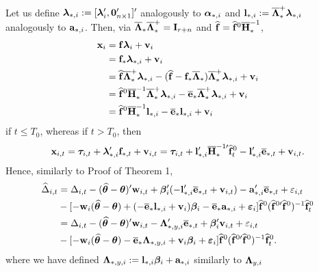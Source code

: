 \documentclass[12pt,fleqn]{article}
\begin{document}
Let us define $\boldsymbol{\lambda}_{*,i} := [\boldsymbol{\lambda}_i', \mathbf{0}_{n\times 1}']'$ analogously to $\boldsymbol{\alpha}_{*,i}$ and $\mathbf{l}_{*,i} := \overline{\boldsymbol{\Lambda}}_*^+\boldsymbol{\lambda}_{*,i}$ analogously to $\mathbf{a}_{*,i}$. Then, via $\overline{\boldsymbol{\Lambda}}_*\overline{\boldsymbol{\Lambda}}_*^+ = \mathbf{I}_{r+n}$ and $\widehat{\mathbf{f}} = \widehat{\mathbf{f}}^0\overline{\mathbf{H}}_*^{-1}$,
\begin{align}
\mathbf{x}_i &= \mathbf{f}\boldsymbol{\lambda}_i + \mathbf{v}_i \notag\\
& = \mathbf{f}_*\boldsymbol{\lambda}_{*,i} + \mathbf{v}_i  \notag\\
& = \widehat{\mathbf{f}}\overline{\boldsymbol{\Lambda}}_*^+\boldsymbol{\lambda}_{*,i} -  (\widehat{\mathbf{f}} - \mathbf{f}_*\overline{\boldsymbol{\Lambda}}_*)\overline{\boldsymbol{\Lambda}}_*^+\boldsymbol{\lambda}_{*,i}  + \mathbf{v}_i \notag\\
& = \widehat{\mathbf{f}}^0\overline{\mathbf{H}}_*^{-1}\overline{\boldsymbol{\Lambda}}_*^+\boldsymbol{\lambda}_{*,i}  - \overline{\mathbf{e}}_{*}\overline{\boldsymbol{\Lambda}}_*^+\boldsymbol{\lambda}_{*,i}  + \mathbf{v}_i\notag\\
& = \widehat{\mathbf{f}}^0\overline{\mathbf{H}}_*^{-1}\mathbf{l}_{*,i}  - \overline{\mathbf{e}}_{*}\mathbf{l}_{*,i}  + \mathbf{v}_i
\end{align}
if $t\leq T_0$, whereas if $t > T_0$, then
\begin{eqnarray}
\mathbf{x}_{i,t} = \boldsymbol{\tau}_{i,t} + \boldsymbol{\lambda}_{*,i}'\mathbf{f}_{*,t} + \mathbf{v}_{i,t} =  \boldsymbol{\tau}_{i,t} + \mathbf{l}_{*,i}'\overline{\mathbf{H}}_*^{-1\prime}\widehat{\mathbf{f}}_t^0  - \mathbf{l}_{*,i}'\overline{\mathbf{e}}_{*,t}  + \mathbf{v}_{i,t}.
\end{eqnarray}
Hence, similarly to Proof of Theorem 1,
\begin{align}
\widehat \Delta_{i,t} & = \Delta_{i,t} - (\widehat{\boldsymbol{\theta}} - \boldsymbol{\theta})'\mathbf{w}_{i,t}  + \boldsymbol{\beta}_i'(- \mathbf{l}_{*,i}'\overline{\mathbf{e}}_{*,t}  + \mathbf{v}_{i,t})  - \mathbf{a}_{*,i}'\overline{\mathbf{e}}_{*,t} + \varepsilon_{i,t} \notag\\
& - [ -\mathbf{w}_{i}(\widehat{\boldsymbol{\theta}} - \boldsymbol{\theta}) + ( - \overline{\mathbf{e}}_{*}\mathbf{l}_{*,i}  + \mathbf{v}_i )\boldsymbol{\beta}_i  - \overline{\mathbf{e}}_*\mathbf{a}_{*,i} +  \boldsymbol{\varepsilon}_{i} ] \widehat{\mathbf{f}}^{0}(\widehat{\mathbf{f}}^{0\prime}\widehat{\mathbf{f}}^0)^{-1}\widehat{\mathbf{f}}_{t}^0 \notag\\
& = \Delta_{i,t} - (\widehat{\boldsymbol{\theta}} - \boldsymbol{\theta})'\mathbf{w}_{i,t} - \boldsymbol{\Lambda}_{*,y,i}'\overline{\mathbf{e}}_{*,t}  + \boldsymbol{\beta}_i' \mathbf{v}_{i,t} + \varepsilon_{i,t} \notag\\
& - [ -\mathbf{w}_{i}(\widehat{\boldsymbol{\theta}} - \boldsymbol{\theta}) - \overline{\mathbf{e}}_{*}\boldsymbol{\Lambda}_{*,y,i} + \mathbf{v}_i\boldsymbol{\beta}_i  + \boldsymbol{\varepsilon}_{i} ] \widehat{\mathbf{f}}^{0}(\widehat{\mathbf{f}}^{0\prime}\widehat{\mathbf{f}}^0)^{-1}\widehat{\mathbf{f}}_{t}^0 .
\end{align}
where we have defined $\boldsymbol{\Lambda}_{*,y,i} :=  \mathbf{l}_{*,i}\boldsymbol{\beta}_i + \mathbf{a}_{*,i}$ similarly to $\boldsymbol{\Lambda}_{y,i}$
\end{document}
